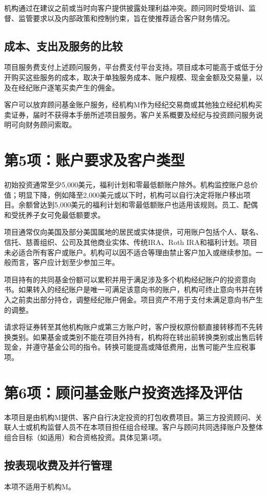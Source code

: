 \documentclass[UTF8,fontset=none,11pt,a4paper]{ctexart}
\begin{document}
机构通过在建议之前或当时向客户提供披露处理利益冲突。顾问同时受培训、监督、监管要求以及内部政策和控制约束，旨在使推荐适合客户财务情况。


\subsection*{成本、支出及服务的比较}
项目服务费支付上述顾问服务，平台费支付平台支持。项目成本可能高于或低于分开购买这些服务的成本，取决于单独服务成本、账户规模、现金金额及交易量，以及在经纪账户逐笔买卖产生的佣金。


客户可以放弃顾问基金账户服务，经机构M作为经纪交易商或其他独立经纪机构买卖证券，届时不获得本手册所述项目服务。客户关系概要及经纪与投资顾问服务说明可向财务顾问索取。


\section*{第5项：账户要求及客户类型}
初始投资通常至少5,000美元，福利计划和零最低额账户除外。机构监控账户总价值；明显下降，例如降至2,000美元或以下时，机构可以自行决定将账户移出项目。余额曾达到5,000美元的福利计划和零最低额账户也适用该规则。员工、配偶和受抚养子女可免最低额要求。


项目通常仅向美国及部分美国属地的居民或实体提供，可用账户包括个人、联名、信托、慈善组织、公司及其他商业实体、传统IRA、Roth IRA和福利计划。项目未必适合所有客户或账户。机构可以因不适合等理由禁止客户加入或继续参加。一般而言，客户应计划至少参加三年。


项目持有的共同基金份额可以累积并用于满足涉及多个机构经纪账户的投资意向书。如果转入的经纪账户是唯一可满足该意向书的账户，机构可终止意向书并在转入之前卖出部分持仓，调整经纪账户佣金。项目资产不用于支付未满足意向书产生的调整。


请求将证券转至其他机构账户或第三方账户时，客户授权原份额直接转移而不先转换类别。如果基金或类别不能在项目外持有，机构将在转出前转换类别或出售后转现金，并遵守基金公司的指令。转换可能提高或降低费用，出售可能产生应税事项。


\section*{第6项：顾问基金账户投资选择及评估}
本项目是由机构M提供、客户自行决定投资的打包收费项目。第三方投资顾问、关联人士或机构监督人员不在本项目担任组合经理。客户与顾问共同选择账户及整体组合目标（如适用）和合资格投资。具体见第4项。


\subsection*{按表现收费及并行管理}
本项不适用于机构M。
\end{document}
